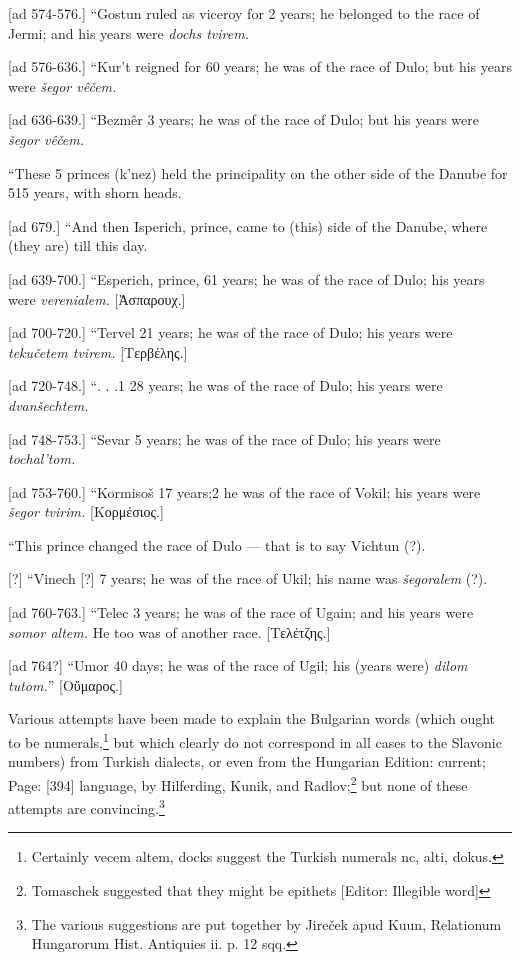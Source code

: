 [ad 574-576.]
\texthebrew{“}Gostun ruled as viceroy for 2 years; he belonged to the race of Jermi; and his years were \emph{dochs tvirem.}

[ad 576-636.]
\texthebrew{“}Kur\texthebrew{}’t reigned for 60 years; he was of the race of Dulo; but his years were \emph{šegor vêčem.}

[ad 636-639.]
\texthebrew{“}Bezmêr 3 years; he was of the race of Dulo; but his years were \emph{šegor vêčem.}

\texthebrew{“}These 5 princes (k\texthebrew{}’nez) held the principality on the other side of the Danube for 515 years, with shorn heads.

[ad 679.]
\texthebrew{“}And then Isperich, prince, came to (this) side of the Danube, where (they are) till this day.

[ad 639-700.]
\texthebrew{“}Esperich, prince, 61 years; he was of the race of Dulo; his years were \emph{verenialem.} [\textgreek{\texthebrew{Ἀ}σπαρουχ}.]

[ad 700-720.]
\texthebrew{“}Tervel 21 years; he was of the race of Dulo; his years were \emph{tekučetem tvirem.} [\textgreek{Τερβέλης}.]

[ad 720-748.]
\texthebrew{“}. . .1 28 years; he was of the race of Dulo; his years were \emph{dvanšechtem.}

[ad 748-753.]
\texthebrew{“}Sevar 5 years; he was of the race of Dulo; his years were \emph{tochal\texthebrew{}’tom.}

[ad 753-760.]
\texthebrew{“}Kormisoš 17 years;2 he was of the race of Vokil; his years were \emph{šegor tvirim.} [\textgreek{Κορμέσιος}.]

\texthebrew{“}This prince changed the race of Dulo \texthebrew{—} that is to say Vichtun (?).

[?]
\texthebrew{“}Vinech [?] 7 years; he was of the race of Ukil; his name was \emph{šegoralem} (?).

[ad 760-763.]
\texthebrew{“}Telec 3 years; he was of the race of Ugain; and his years were \emph{somor altem.} He too was of another race. [\textgreek{Τελέτζης}.]

[ad 764?]
\texthebrew{“}Umor 40 days; he was of the race of Ugil; his (years were) \emph{dilom tutom.}\texthebrew{}” [\textgreek{Ο\texthebrew{ὔ}μαρος}.]

Various attempts have been made to explain the Bulgarian words (which ought to be numerals,\footnote{Certainly vecem altem, docks suggest the Turkish numerals nc, alti, dokus.} but which clearly do not correspond in all cases to the Slavonic numbers) from Turkish dialects, or even from the Hungarian Edition: current; Page: [394] language, by Hilferding, Kunik, and Radlov;\footnote{Tomaschek suggested that they might be epithets [Editor: Illegible word]} but none of these attempts are convincing.\footnote{The various suggestions are put together by Jireček apud Kuun, Relationum Hungarorum Hist. Antiquies ii. p. 12 sqq.}

